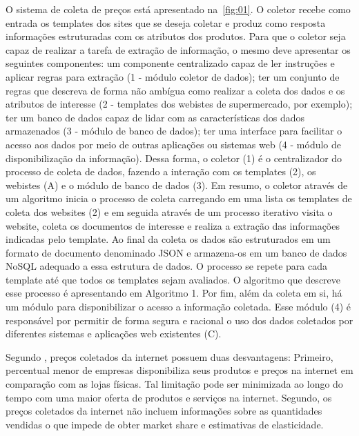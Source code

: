 \documentclass[twoside,a4paper,11pt]{report}
\begin{document}
O sistema de coleta de preços está apresentado na~\ref{fig:01}. O coletor recebe como entrada os templates dos sites que se deseja coletar e produz como resposta informações estruturadas com os atributos dos produtos. Para que o coletor seja capaz de realizar a tarefa de extração de informação, o mesmo deve apresentar os seguintes componentes: um componente centralizado capaz de ler instruções e aplicar regras para extração (1 - módulo coletor de dados); ter um conjunto de regras que descreva de forma não ambígua como realizar a coleta dos dados e os atributos de interesse (2 - templates dos webistes de supermercado, por exemplo); ter um banco de dados capaz de lidar com as características dos dados armazenados (3 - módulo de banco de dados); ter uma interface para facilitar o acesso aos dados por meio de outras aplicações ou sistemas web (4 - módulo de disponibilização da informação). Dessa forma, o coletor (1) é o centralizador do processo de coleta de dados, fazendo a interação com os templates (2), os webistes (A) e o módulo de banco de dados (3). Em resumo, o coletor através de um algoritmo inicia o processo de coleta carregando em uma lista os templates de coleta dos websites (2) e em seguida através de um processo iterativo visita o website, coleta os documentos de interesse e realiza a extração das informações indicadas pelo template. Ao final da coleta os dados são estruturados em um formato de documento denominado JSON e armazena-os em um banco de dados NoSQL adequado a essa estrutura de dados. O processo se repete para cada template até que todos os templates sejam avaliados. O algoritmo que descreve esse processo é apresentando em Algoritmo 1. Por fim, além da coleta em si, há um módulo para disponibilizar o acesso a informação coletada. Esse módulo (4) é responsável por permitir de forma segura e racional o uso dos dados coletados por diferentes sistemas e aplicações web existentes (C).

Segundo \citet{cavallo2010scraped}, preços coletados da internet possuem duas desvantagens: Primeiro, percentual menor de empresas disponibiliza seus produtos e preços na internet em comparação com as lojas físicas. Tal limitação pode ser minimizada ao longo do tempo com uma maior oferta de produtos e serviços na internet. Segundo, os preços coletados da internet não incluem informações sobre as quantidades vendidas o que impede de obter market share e estimativas de elasticidade.
\end{document}
